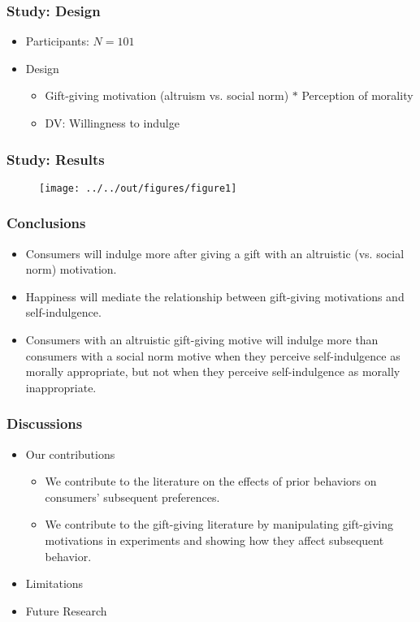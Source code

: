 \documentclass[11pt]{beamer}
\begin{document}
\begin{frame}[t]
\frametitle{Study: Design}
\begin{itemize}
\item<+-> Participants: $N = 101$
\item<+-> Design
\begin{itemize}
\item<+-> Gift-giving motivation (altruism vs. social norm) $*$ Perception of morality
\item<+-> DV: Willingness to indulge
\end{itemize}
\end{itemize}
\note{~}
\end{frame}



\begin{frame}[t]
\frametitle{Study: Results}
\begin{figure}
\centering
\texttt{[image: ../../out/figures/figure1]}
\end{figure}
\end{frame}


\begin{frame}[t]
\frametitle{Conclusions}
\begin{itemize}
\item<+-> Consumers will indulge more after giving a gift with an altruistic (vs. social norm) motivation.
\item<+-> Happiness will mediate the relationship between gift-giving motivations and self-indulgence.
\item<+-> Consumers with an altruistic gift-giving motive will indulge more than consumers with a social norm motive when they perceive self-indulgence as morally appropriate, but not when they perceive self-indulgence as morally inappropriate.
\end{itemize}
\note{~}
\end{frame}



\begin{frame}[t]
\frametitle{Discussions}
\begin{itemize}
\item<+-> Our contributions
\begin{itemize}
\item<+-> We contribute to the literature on the effects of prior behaviors on consumers’ subsequent preferences.
\item<+-> We contribute to the gift-giving literature by manipulating gift-giving motivations in experiments and showing how they affect subsequent behavior.
\end{itemize}
\item<+-> Limitations
\item<+-> Future Research
\end{itemize}
\note{~}
\end{frame}
\end{document}
